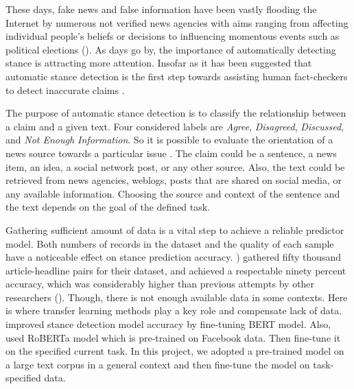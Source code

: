These days, fake news and false information have been vastly flooding the Internet by numerous not verified news agencies with aims ranging from affecting individual people’s beliefs or decisions to influencing momentous events such as political elections (\cite{memory_network}). As days go by, the importance of automatically detecting stance is attracting more attention. Insofar as it has been suggested that automatic stance detection is the first step towards assisting human fact-checkers to detect inaccurate claims \cite{UCLMR}.



The purpose of automatic stance detection is to classify the relationship between a claim and a given text. Four considered labels are \textit{Agree}, \textit{Disagreed}, \textit{Discussed}, and \textit{Not Enough Information}. So it is possible to evaluate the orientation of a news source towards a particular issue \cite{UCLMR}. The claim could be a sentence, a news item, an idea, a social network post, or any other source. Also, the text could be retrieved from news agencies, weblogs, posts that are shared on social media, or any available information. Choosing the source and context of the sentence and the text depends on the goal of the defined task. 

Gathering sufficient amount of data is a vital step to achieve a reliable predictor model. Both numbers of records in the dataset and the quality of each sample have a noticeable effect on stance prediction accuracy. \cite{takestancefake}) gathered fifty thousand article-headline pairs for their dataset, and achieved a respectable ninety percent accuracy, which was considerably higher than previous attempts by other researchers (\cite{book_fake}). Though, there is not enough available data in some contexts. Here is where transfer learning methods play a key role and compensate lack of data. \cite{stance_robust} improved stance detection model accuracy by fine-tuning \ac{BERT} model.
Also, \cite{takestancefake} used RoBERTa model which is pre-trained on Facebook data. Then fine-tune it on the specified current task. In this project, we adopted a pre-trained model on a large text corpus in a general context and then fine-tune the model on task-specified data.

